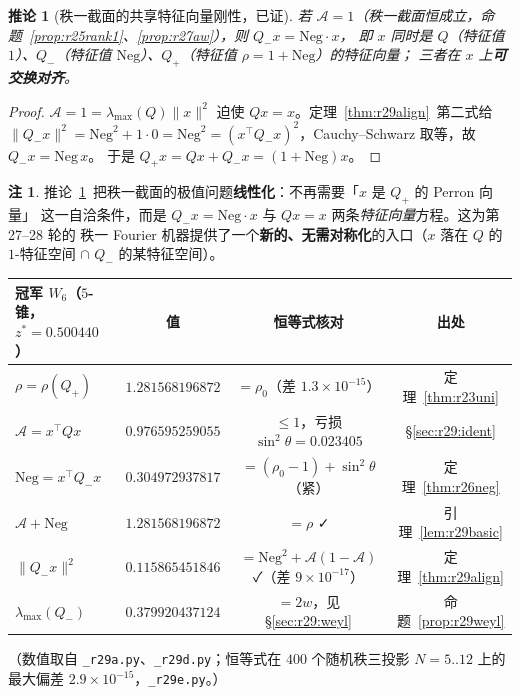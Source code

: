 \documentclass[UTF8,11pt]{ctexart}
\newtheorem{corollary}[theorem]{推论}
\theoremstyle{definition}
\newtheorem{remark}[theorem]{注}
\begin{document}
\begin{corollary}[秩一截面的共享特征向量刚性，已证]\label{cor:r29rank1}
若 $\mathcal A=1$（秩一截面恒成立，命题~\ref{prop:r25rank1}、\ref{prop:r27aw}），则 $Q_-x=\mathrm{Neg}\cdot x$，
即 $x$ 同时是 $Q$（特征值 $1$）、$Q_-$（特征值 $\mathrm{Neg}$）、$Q_+$（特征值 $\rho=1+\mathrm{Neg}$）的特征向量；
三者在 $x$ 上\textbf{可交换对齐}。
\end{corollary}
\begin{proof}
$\mathcal A=1=\lambda_{\max}(Q)\|x\|^2$ 迫使 $Qx=x$。定理~\ref{thm:r29align}~第二式给
$\|Q_-x\|^2=\mathrm{Neg}^2+1\cdot0=\mathrm{Neg}^2=(x^\top Q_-x)^2$，Cauchy--Schwarz 取等，故 $Q_-x=\mathrm{Neg}\,x$。
于是 $Q_+x=Qx+Q_-x=(1+\mathrm{Neg})x$。
\end{proof}
\begin{remark}
推论~\ref{cor:r29rank1}~把秩一截面的极值问题\textbf{线性化}：不再需要「$x$ 是 $Q_+$ 的 Perron 向量」
这一自洽条件，而是 $Q_-x=\mathrm{Neg}\cdot x$ 与 $Qx=x$ 两条\emph{特征向量}方程。这为第 27--28 轮的
秩一 Fourier 机器提供了一个\textbf{新的、无需对称化}的入口（$x$ 落在 $Q$ 的 $1$-特征空间 $\cap$ $Q_-$ 的某特征空间）。
\end{remark}

\begin{center}\small
\begin{tabular}{lccc}
\toprule
冠军 $W_6$（$5$-锥，$z^*=0.500440$）& 值 & 恒等式核对 & 出处\\
\midrule
$\rho=\rho(Q_+)$ & $1.281568196872$ & $=\rho_0$（差 $1.3\times10^{-15}$）& 定理~\ref{thm:r23uni}\\
$\mathcal A=x^\top Qx$ & $0.976595259055$ & $\le1$，亏损 $\sin^2\theta=0.023405$ & \S\ref{sec:r29:ident}\\
$\mathrm{Neg}=x^\top Q_-x$ & $0.304972937817$ & $=(\rho_0-1)+\sin^2\theta$（紧）& 定理~\ref{thm:r26neg}\\
$\mathcal A+\mathrm{Neg}$ & $1.281568196872$ & $=\rho$ ✓ & 引理~\ref{lem:r29basic}\\
$\|Q_-x\|^2$ & $0.115865451846$ & $=\mathrm{Neg}^2+\mathcal A(1-\mathcal A)$ ✓（差 $9\times10^{-17}$）& 定理~\ref{thm:r29align}\\
$\lambda_{\max}(Q_-)$ & $0.379920437124$ & $=2w$，见 \S\ref{sec:r29:weyl} & 命题~\ref{prop:r29weyl}\\
\bottomrule
\end{tabular}
\end{center}
（数值取自 \texttt{\_r29a.py}、\texttt{\_r29d.py}；恒等式在 $400$ 个随机秩三投影 $N=5..12$ 上的最大偏差
$2.9\times10^{-15}$，\texttt{\_r29e.py}。）
\end{document}
